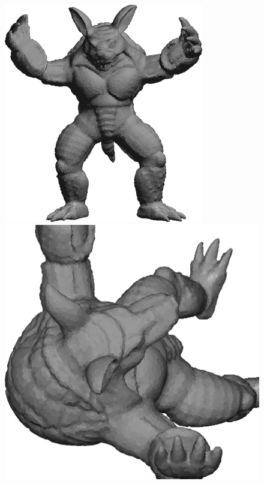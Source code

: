 \begin{figure}[!h]
    \centering
    \centering
    \includegraphics[scale=0.355]{images/armadillo-extendfs.png}
    \endminipage\hfill
    \centering
    \includegraphics[scale=0.3]{images/armadillo-extendfs-1.png}
    \endminipage\hfill
    \centering

\end{figure}
